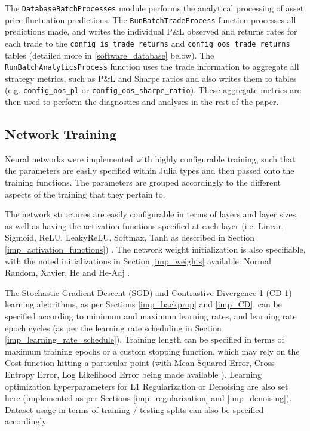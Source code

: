 \documentclass[a4paper,11pt,oneside]{article}
\theoremstyle{plain}
\theoremstyle{definition}
\begin{document}
	The \texttt{DatabaseBatchProcesses} module \citep{DCDatabaseBatchProcesses} performs the analytical processing of asset price fluctuation predictions. The \texttt{RunBatchTradeProcess} function processes all predictions made, and writes the individual P\&L observed and returns rates for each trade to the \texttt{config\_is\_trade\_returns} and \texttt{config\_oos\_trade\_returns} tables (detailed more in \ref{software_database} below). The \texttt{RunBatchAnalyticsProcess} function uses the trade information to aggregate all strategy metrics, such as P\&L and Sharpe ratios and also writes them to tables (e.g. \texttt{config\_oos\_pl} or \texttt{config\_oos\_sharpe\_ratio}). These aggregate metrics are then used to perform the diagnostics and analyses in the rest of the paper.
	
	\subsection{Network Training}
	
	Neural networks were implemented with highly configurable training, such that the parameters are easily specified within Julia types \citep{DCTrainingStructures} and then passed onto the training functions. The parameters are grouped accordingly to the different aspects of the training that they pertain to. \newline
	
	The network structures are easily configurable in terms of layers and layer sizes, as well as having the activation functions specified at each layer (i.e. Linear, Sigmoid, ReLU, LeakyReLU, Softmax, Tanh as described in Section \ref{imp_activation_functions}) \citep{DCActivationFunctions}. The network weight initialization is also specifiable, with the noted initializations in Section \ref{imp_weights} available: Normal Random, Xavier, He and He-Adj \citep{DCInitializationFunctions}.\newline
	
	The Stochastic Gradient Descent (SGD) and Contrastive Divergence-1 (CD-1) learning algorithms, as per Sections \ref{imp_backprop} and \ref{imp_CD}, can be specified according to minimum and maximum learning rates, and learning rate epoch cycles (as per the learning rate scheduling in Section \ref{imp_learning_rate_schedule}). Training length can be specified in terms of maximum training epochs or a custom stopping function, which may rely on the Cost function hitting a particular point (with Mean Squared Error, Cross Entropy Error, Log Likelihood Error being made available \citep{DCCostFunctions}). Learning optimization hyperparameters for L1 Regularization or Denoising are also set here (implemented as per Sections \ref{imp_regularization} and \ref{imp_denoising}). Dataset usage in terms of training / testing splits can also be specified accordingly.\newline
	
\end{document}
